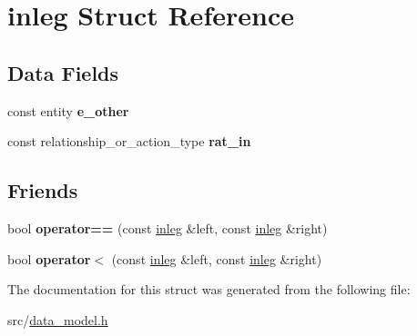 \hypertarget{structinleg}{}\section{inleg Struct Reference}
\label{structinleg}
\subsection*{Data Fields}
\begin{DoxyCompactItemize}
\item 
\mbox{\label{structinleg_aba333b51cf25d7c6ec723fe3587e1b2f}} 
const entity {\bfseries e\+\_\+other}
\item 
\mbox{\label{structinleg_a431e305dd15d471472f1fb9871928153}} 
const relationship\+\_\+or\+\_\+action\+\_\+type {\bfseries rat\+\_\+in}
\end{DoxyCompactItemize}
\subsection*{Friends}
\begin{DoxyCompactItemize}
\item 
\mbox{\label{structinleg_a2882c00597e94a9fb19cde857cfe5003}} 
bool {\bfseries operator==} (const \hyperlink{structinleg}{inleg} \&left, const \hyperlink{structinleg}{inleg} \&right)
\item 
\mbox{\label{structinleg_a8ddd31813cdcbb1b7c88d51fcd01cd23}} 
bool {\bfseries operator$<$} (const \hyperlink{structinleg}{inleg} \&left, const \hyperlink{structinleg}{inleg} \&right)
\end{DoxyCompactItemize}


The documentation for this struct was generated from the following file\+:\begin{DoxyCompactItemize}
\item 
src/\hyperlink{data__model_8h}{data\+\_\+model.\+h}\end{DoxyCompactItemize}
